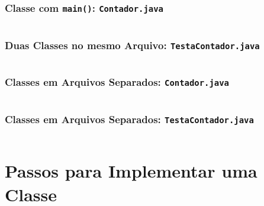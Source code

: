 \documentclass[xcolor={dvipsnames,table},aspectratio=169]{beamer}
\begin{document}
\begin{frame}[fragile]\frametitle{Classe com \texttt{main()}: \texttt{Contador.java}}
{\tiny\inputminted[bgcolor=cyan!10]{java}{src/contagem3/Contador.java}}
\end{frame}

\begin{frame}[fragile]\frametitle{Duas Classes no mesmo Arquivo: \texttt{TestaContador.java}}
{\tiny\inputminted[bgcolor=cyan!10]{java}{src/contagem4/TestaContador.java}}
\end{frame}

\begin{frame}[fragile]\frametitle{Classes em Arquivos Separados: \texttt{Contador.java}}
{\tiny\inputminted[bgcolor=cyan!10]{java}{src/contagem5/Contador.java}}
\end{frame}

\begin{frame}[fragile]\frametitle{Classes em Arquivos Separados: \texttt{TestaContador.java}}
{\tiny\inputminted[bgcolor=cyan!10]{java}{src/contagem5/TestaContador.java}}
\end{frame}

\section{Passos para Implementar uma Classe}
\end{document}
